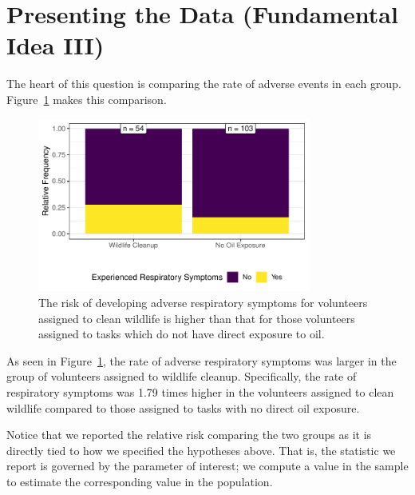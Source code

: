 \documentclass[
  letterpaper,
  DIV=11,
  numbers=noendperiod]{scrreprt}
\theoremstyle{definition}
\theoremstyle{definition}
\theoremstyle{plain}
\theoremstyle{remark}
\begin{document}
\hypertarget{presenting-the-data-fundamental-idea-iii}{%
\section{Presenting the Data (Fundamental Idea
III)}\label{presenting-the-data-fundamental-idea-iii}}

The heart of this question is comparing the rate of adverse events in
each group. Figure~\ref{fig-recaplanguage-deepwater-plot} makes this
comparison.

\begin{figure}

{\centering \includegraphics[width=0.8\textwidth,height=\textheight]{./images/fig-recaplanguage-deepwater-plot-1.pdf}

}

\caption{\label{fig-recaplanguage-deepwater-plot}The risk of developing
adverse respiratory symptoms for volunteers assigned to clean wildlife
is higher than that for those volunteers assigned to tasks which do not
have direct exposure to oil.}

\end{figure}

As seen in Figure~\ref{fig-recaplanguage-deepwater-plot}, the rate of
adverse respiratory symptoms was larger in the group of volunteers
assigned to wildlife cleanup. Specifically, the rate of respiratory
symptoms was 1.79 times higher in the volunteers assigned to clean
wildlife compared to those assigned to tasks with no direct oil
exposure.

Notice that we reported the relative risk comparing the two groups as it
is directly tied to how we specified the hypotheses above. That is, the
statistic we report is governed by the parameter of interest; we compute
a value in the sample to estimate the corresponding value in the
population.
\end{document}
